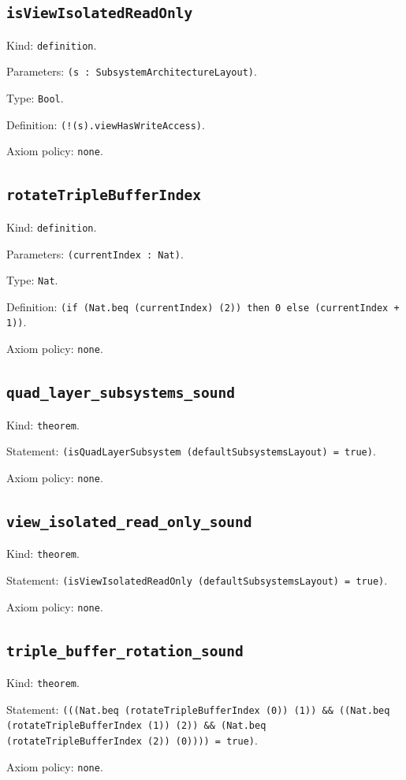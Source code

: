 \documentclass[11pt]{article}
\begin{document}
\subsection*{\texttt{isViewIsolatedReadOnly}}
\noindent Kind: \texttt{definition}.\par
\noindent Parameters: \texttt{(s : SubsystemArchitectureLayout)}.\par
\noindent Type: \texttt{Bool}.\par
\noindent Definition: \texttt{(!(s).viewHasWriteAccess)}.\par
\noindent Axiom policy: \texttt{none}.\par
\subsection*{\texttt{rotateTripleBufferIndex}}
\noindent Kind: \texttt{definition}.\par
\noindent Parameters: \texttt{(currentIndex : Nat)}.\par
\noindent Type: \texttt{Nat}.\par
\noindent Definition: \texttt{(if (Nat.beq (currentIndex) (2)) then 0 else (currentIndex + 1))}.\par
\noindent Axiom policy: \texttt{none}.\par
\subsection*{\texttt{quad\_layer\_subsystems\_sound}}
\noindent Kind: \texttt{theorem}.\par
\noindent Statement: \texttt{(isQuadLayerSubsystem (defaultSubsystemsLayout) = true)}.\par
\noindent Axiom policy: \texttt{none}.\par
\subsection*{\texttt{view\_isolated\_read\_only\_sound}}
\noindent Kind: \texttt{theorem}.\par
\noindent Statement: \texttt{(isViewIsolatedReadOnly (defaultSubsystemsLayout) = true)}.\par
\noindent Axiom policy: \texttt{none}.\par
\subsection*{\texttt{triple\_buffer\_rotation\_sound}}
\noindent Kind: \texttt{theorem}.\par
\noindent Statement: \texttt{(((Nat.beq (rotateTripleBufferIndex (0)) (1)) \&\& ((Nat.beq (rotateTripleBufferIndex (1)) (2)) \&\& (Nat.beq (rotateTripleBufferIndex (2)) (0)))) = true)}.\par
\noindent Axiom policy: \texttt{none}.\par
\end{document}
